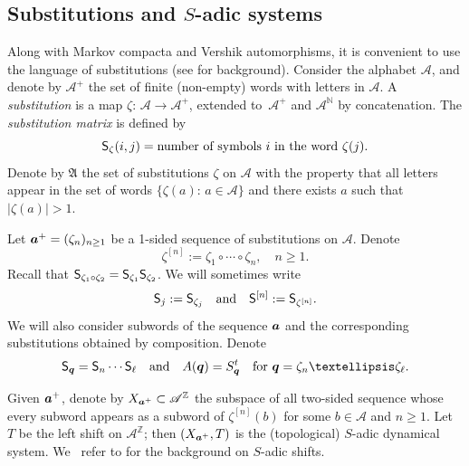 \documentclass[11pt]{article}
\numberwithin{equation}{section}\newcommand{\Relation}[2][]{}\newtheorem*{prop*}{Proposition}
\let\mathcal\mathscr
\theoremstyle{plain}
\theoremstyle{definition}
\newcommand\bq{{\boldsymbol q}}
\newcommand\FrA{\mathfrak{A}}
\newcommand\Ak{\mathcal{A}}
\newcommand\A{\mathcal{A}}
\newcommand{\Z}{\mathbb{Z}}
\newcommand{\N}{\mathbb{N}}
\newcommand\Sf{{\sf S}}
\newcommand\be{\begin{equation}}
\newcommand\ee{\end{equation}}
\begin{document}
\subsection{Substitutions and $S$-adic systems} \label{sec-Sadic}
Along with Markov compacta and Vershik automorphisms, it is convenient to use the language of {substitutions} (see \cite{Queff,Fogg} for background). Consider the
alphabet $\Ak$, and denote by $\Ak^+$ the set of finite (non-empty) words with letters in $\Ak$. A \emph{substitution} is a map $\zeta:\,\A\to \A^+$, extended to~$\A^+$ and $\A^{\N}$ by concatenation.
The \emph{substitution matrix} is defined by
\be \label{sub-mat}
\Sf_\zeta (i,j) = \text{number of symbols}\ i\ \text{in the word}\ \zeta(j).
\ee
Denote by $\FrA$ the set of substitutions $\zeta$ on $\Ak$ with the property that all letters appear in the set of words $\{\zeta(a):\,a\in \Ak\}$ and there exists $a$ such that $|\zeta(a)|>1$.

Let ${\boldsymbol a}^+ =(\zeta_n)_{n\ge 1}$ be a 1-sided sequence of substitutions on $\Ak$. Denote
\[
\zeta^{[n]} := \zeta_1\circ \cdots\circ\zeta_n,\quad n\ge 1.
\]
Recall that $\Sf_{\zeta_1\circ \zeta_2} = \Sf_{\zeta_1}\Sf_{\zeta_2}$.
We will sometimes write
\[
\Sf_j:= \Sf_{\zeta_j}\quad \text{and}\quad \Sf^{[n]}:= \Sf_{\zeta^{[n]}}.
\]
We will also consider subwords of the sequence ${\boldsymbol a}$ and the corresponding substitutions obtained by composition. Denote
\be \label{notation1}
\Sf_\bq = \Sf_n\cdots \Sf_\ell\quad \text{and}\quad A(\bq) = S_\bq^t\quad \text{for }\bq = \zeta_{n}\ldots\zeta_{\ell}.
\ee

Given ${\boldsymbol a}^+$, denote by $X_{\ba^+}\subset \Ak^\Z$ the subspace of all two-sided sequence whose every subword appears as a subword of
$\zeta^{[n]}(b)$ for some $b\in \Ak$ and $n\ge 1$. Let $T$ be the left shift on $\Ak^\Z$; then $(X_{{\boldsymbol a}^+},T)$ is the (topological) $S$-adic dynamical system.
We~ refer to \cite{BD,BST_2019,BSTY} for the background on $S$-adic shifts.
\end{document}
